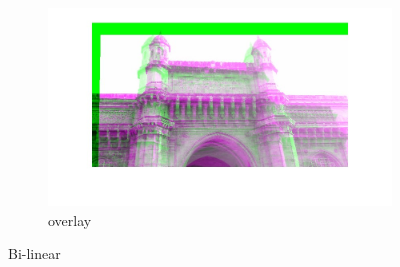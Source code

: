 \documentclass[a4paper]{article}
\begin{document}
\begin{figure}[H]
\begin{subfigure}{.4\textwidth}
\end{subfigure}
\begin{subfigure}{.4\textwidth}
  \centering
  \includegraphics[width=.8\linewidth]{ob.jpg}  
  \caption{overlay}
  
\end{subfigure}
\caption{Bi-linear}

\end{figure}
\end{document}
